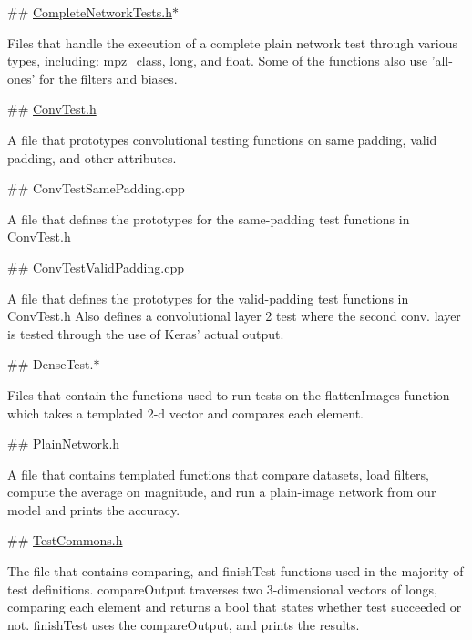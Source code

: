 \#\# \hyperlink{CompleteNetworkTests_8h_source}{Complete\+Network\+Tests.\+h}$\ast$ 
\begin{DoxyCode}
Files that handle the execution of a complete plain network test through various types, including:
       mpz\_class, long, and float. Some of the functions also use 'all-ones' for the filters and biases.
\end{DoxyCode}


\#\# \hyperlink{ConvTest_8h_source}{Conv\+Test.\+h} 
\begin{DoxyCode}
A file that prototypes convolutional testing functions on same padding, valid padding, and other
       attributes.
\end{DoxyCode}


\#\# Conv\+Test\+Same\+Padding.\+cpp 
\begin{DoxyCode}
A file that defines the prototypes for the same-padding test functions in ConvTest.h
\end{DoxyCode}


\#\# Conv\+Test\+Valid\+Padding.\+cpp 
\begin{DoxyCode}
A file that defines the prototypes for the valid-padding test functions in ConvTest.h
Also defines a convolutional layer 2 test where the second conv. layer is tested through the use of Keras'
       actual output. 
\end{DoxyCode}


\#\# Dense\+Test.$\ast$ 
\begin{DoxyCode}
Files that contain the functions used to run tests on the flattenImages function which takes a templated
       2-d vector and compares each element.
\end{DoxyCode}


\#\# Plain\+Network.\+h 
\begin{DoxyCode}
A file that contains templated functions that compare datasets, load filters, compute the average on
       magnitude, and run a plain-image network from our model and prints the accuracy.
\end{DoxyCode}


\#\# \hyperlink{TestCommons_8h_source}{Test\+Commons.\+h} 
\begin{DoxyCode}
The file that contains comparing, and finishTest functions used in the majority of test definitions.
compareOutput traverses two 3-dimensional vectors of longs, comparing each element and returns a bool that
       states whether test succeeded or not.
finishTest uses the compareOutput, and prints the results.
\end{DoxyCode}


